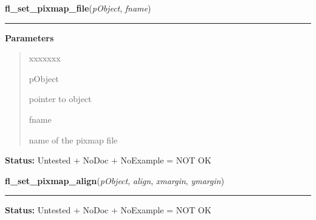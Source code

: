 \hspace{.8\funcindent}\begin{boxedminipage}{\funcwidth}

    \raggedright \textbf{fl\_set\_pixmap\_file}(\textit{pObject}, \textit{fname})

    \vspace{-1.5ex}

    \rule{\textwidth}{0.5\fboxrule}
\setlength{\parskip}{2ex}
\setlength{\parskip}{1ex}
      \textbf{Parameters}
      \vspace{-1ex}

      \begin{quote}
        \begin{Ventry}{xxxxxxx}

          \item[pObject]

          pointer to object

          \item[fname]

          name of the pixmap file

        \end{Ventry}

      \end{quote}

\textbf{Status:} Untested + NoDoc + NoExample = NOT OK



    \end{boxedminipage}

    \label{xformslib:library:fl_set_pixmap_align}

    \vspace{0.5ex}

\hspace{.8\funcindent}\begin{boxedminipage}{\funcwidth}

    \raggedright \textbf{fl\_set\_pixmap\_align}(\textit{pObject}, \textit{align}, \textit{xmargin}, \textit{ymargin})

    \vspace{-1.5ex}

    \rule{\textwidth}{0.5\fboxrule}
\setlength{\parskip}{2ex}
\setlength{\parskip}{1ex}
\textbf{Status:} Untested + NoDoc + NoExample = NOT OK



    \end{boxedminipage}

